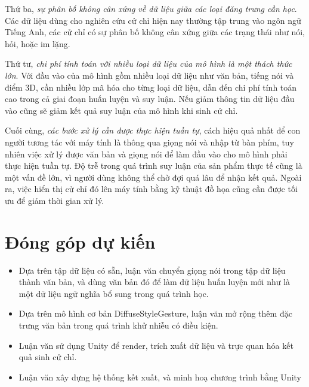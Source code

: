 Thứ ba, \textit{sự phân bố không cân xứng về  dữ liệu giữa các loại đăng trưng cần học}. Các dữ liệu dùng cho nghiên cứu cử chỉ hiện nay thường tập trung vào ngôn ngữ Tiếng Anh, các cử chỉ có sự phân bố không cân xứng giữa các trạng thái như nói, hỏi, hoặc im lặng.

Thứ tư, \textit{chi phí tính toán với nhiều loại dữ liệu của mô hình là một thách thức lớn}. Với đầu vào của mô hình gồm nhiều loại dữ liệu như văn bản, tiếng nói và điểm 3D, cần nhiều lớp mã hóa cho từng loại dữ liệu, dẫn đến chi phí tính toán cao trong cả giai đoạn huấn luyện và suy luận. Nếu giảm thông tin dữ liệu đầu vào cũng sẽ giảm kết quả suy luận của mô hình khi sinh cử chỉ.

Cuối cùng, \textit{các bước xử lý cần được thực hiện tuần tự}, cách hiệu quả nhất để con người tương tác với máy tính là thông qua giọng nói và nhập từ bàn phím, tuy nhiên việc xử lý được văn bản và giọng nói để làm đầu vào cho mô hình phải thực hiện tuần tự. Độ trễ trong quá trình suy luận của sản phẩm thực tế cũng là một vấn đề lớn, vì người dùng không thể chờ đợi quá lâu để nhận kết quả. Ngoài ra, việc hiển thị cử chỉ đó lên máy tính bằng kỹ thuật đồ họa cũng cần được tối ưu để giảm thời gian xử lý.


\section{Đóng góp dự kiến}

\begin{itemize}
	\item Dựa trên tập dữ liệu có sẵn, luận văn chuyển giọng nói trong tập dữ liệu thành văn bản, và dùng văn bản đó để làm dữ liệu huấn luyện mới như là một dữ liệu ngữ nghĩa bổ sung trong quá trình học.
	
	\item Dựa trên mô hình cơ bản DiffuseStyleGesture, luận văn mở rộng thêm đặc trưng văn bản trong quá trình khử nhiễu có điều kiện.
	
	\item Luận văn sử dụng Unity để render, trích xuất dữ liệu và trực quan hóa kết quả sinh cử chỉ.
	
	\item Luận văn xây dựng hệ thống kết xuất, và minh hoạ chương trình bằng Unity
\end{itemize}




